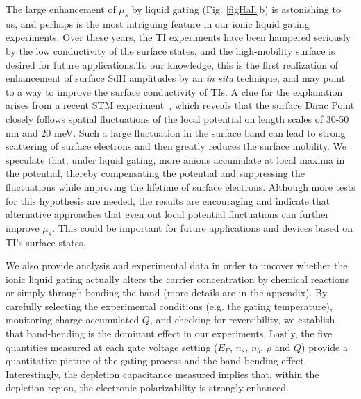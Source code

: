 The large enhancement of $\mu_s$
by liquid gating (Fig. \ref{figHall}b) is astonishing to us, and perhaps is the most intriguing 
feature in our ionic liquid gating experiments. Over these years, the TI experiments have been hampered seriously by the low conductivity of the surface states, and the high-mobility surface is desired for future applications.To our knowledge, this is the first realization of 
enhancement of surface SdH amplitudes by an \emph{in situ} technique, and may point to a way to improve the surface conductivity of TIs. A clue for the explanation arises from a recent STM experiment~\cite{Beidenkopf2011}, which reveals that
the surface Dirac Point closely follows spatial fluctuations of the local
potential on length scales of 30-50 nm and 20 meV. Such a large fluctuation in the surface band can lead to strong scattering
of surface electrons and then greatly reduces the surface mobility. We speculate that, under liquid gating, more anions accumulate
at local maxima in the potential, thereby compensating the potential and suppressing the fluctuations while improving the lifetime of surface electrons.
Although more tests for this hypothesis are needed, the results are encouraging and indicate that alternative approaches that even out local
potential fluctuations can further improve $\mu_s$. This could be important for future applications and devices based on TI's surface states.

We also provide analysis and experimental data in order to uncover whether the ionic liquid gating actually alters the carrier concentration by chemical
reactions or simply through bending the band (more details are in the appendix). 
By carefully selecting the experimental conditions (e.g. the gating temperature),
monitoring charge accumulated $Q$, and checking for reversibility, we establish that band-bending is the dominant effect
in our experiments. Lastly, the five quantities measured at each gate voltage setting ($E_F$, $n_s$, $n_b$, $\rho$ and $Q$)
provide a quantitative picture of the gating process and the band bending effect. Interestingly, the depletion
capacitance measured implies that, within the depletion region, the electronic polarizability is strongly enhanced.
